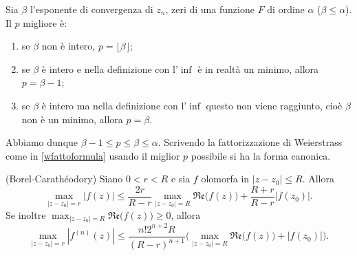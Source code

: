 \begin{oss}
  Sia $\beta$ l'esponente di convergenza di $z_n$, zeri di una funzione $F$ di ordine $\alpha$ ($\beta \le \alpha$). Il $p$ migliore è:
  \begin{enumerate}
    \item se $\beta$ non è intero, $p=\lfloor\beta\rfloor$;
    \item se $\beta$ è intero e nella definizione con l'$\inf$ è in realtà un minimo, allora $p=\beta-1$;
    \item se $\beta$ è intero ma nella definizione con l'$\inf$ questo non viene raggiunto, cioè $\beta$ non è un minimo, allora $p=\beta$.
  \end{enumerate}
  Abbiamo dunque $\beta-1 \le p \le \beta \le \alpha$. Scrivendo la fattorizzazione di Weierstrass come in \eqref{wfattoformula} usando il miglior $p$ possibile si ha la forma canonica.
\end{oss}

\begin{thm}
  (Borel-Carathéodory) Siano $0<r<R$ e sia $f$ olomorfa in $|z-z_0| \le R$. Allora
  \begin{equation*}
    \max_{|z-z_0|=r}|f(z)| \le \frac{2r}{R-r}\max_{|z-z_0|=R}\mathfrak{Re}\big(f(z)\big)+\frac{R+r}{R-r}|f(z_0)|.
  \end{equation*}
  Se inoltre $\displaystyle \max_{|z-z_0|=R}\mathfrak{Re}\big(f(z)\big) \ge 0$, allora
  \begin{equation*}
    \max_{|z-z_0|=r}|f^{(n)}(z)| \le \frac{n!2^{n+2}R}{(R-r)^{n+1}}\Big(\max_{|z-z_0|=R}\mathfrak{Re}\big(f(z)\big)+|f(z_0)|\Big).
  \end{equation*}
\end{thm}

